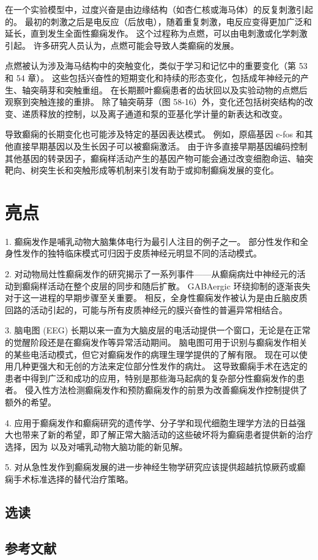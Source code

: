 在一个实验模型中，过度兴奋是由边缘结构（如杏仁核或海马体）的反复刺激引起的。 最初的刺激之后是电反应（后放电），随着重复刺激，电反应变得更加广泛和延长，直到发生全面性癫痫发作。 这个过程称为点燃，可以由电刺激或化学刺激引起。 许多研究人员认为，点燃可能会导致人类癫痫的发展。

点燃被认为涉及海马结构中的突触变化，类似于学习和记忆中的重要变化（第 53 和 54 章）。 这些包括兴奋性的短期变化和持续的形态变化，包括成年神经元的产生、轴突萌芽和突触重组。 在长期颞叶癫痫患者的齿状回以及实验动物的点燃后观察到突触连接的重排。 除了轴突萌芽（图 58-16）外，变化还包括树突结构的改变、递质释放的控制，以及离子通道和泵的亚基化学计量的新表达和改变。

导致癫痫的长期变化也可能涉及特定的基因表达模式。 例如，原癌基因 c-fos 和其他直接早期基因以及生长因子可以被癫痫激活。 由于许多直接早期基因编码控制其他基因的转录因子，癫痫样活动产生的基因产物可能会通过改变细胞命运、轴突靶向、树突生长和突触形成等机制来引发有助于或抑制癫痫发展的变化。


\section{亮点}

1. 癫痫发作是哺乳动物大脑集体电行为最引人注目的例子之一。 部分性发作和全身性发作的独特临床模式可归因于皮质神经元明显不同的活动模式。 

2. 对动物局灶性癫痫发作的研究揭示了一系列事件——从癫痫病灶中神经元的活动到癫痫样活动在整个皮层的同步和随后扩散。 GABAergic 环绕抑制的逐渐丧失对于这一进程的早期步骤至关重要。 相反，全身性癫痫发作被认为是由丘脑皮质回路的活动引起的，可能与所有皮质神经元的膜兴奋性的普遍异常相结合。 

3. 脑电图 (EEG) 长期以来一直为大脑皮层的电活动提供一个窗口，无论是在正常的觉醒阶段还是在癫痫发作等异常活动期间。 脑电图可用于识别与癫痫发作相关的某些电活动模式，但它对癫痫发作的病理生理学提供的了解有限。 现在可以使用几种更强大和无创的方法来定位部分性发作的病灶。 这导致癫痫手术在选定的患者中得到广泛和成功的应用，特别是那些海马起病的复杂部分性癫痫发作的患者。 侵入性方法检测癫痫发作和预防癫痫发作的前景为改善癫痫发作控制提供了额外的希望。 

4. 应用于癫痫发作和癫痫研究的遗传学、分子学和现代细胞生理学方法的日益强大也带来了新的希望，即了解正常大脑活动的这些破坏将为癫痫患者提供新的治疗选择，因为 以及对哺乳动物大脑功能的新见解。 

5. 对从急性发作到癫痫发展的进一步神经生物学研究应该提供超越抗惊厥药或癫痫手术标准选择的替代治疗策略。

\subsection{选读}
\subsection{参考文献}
